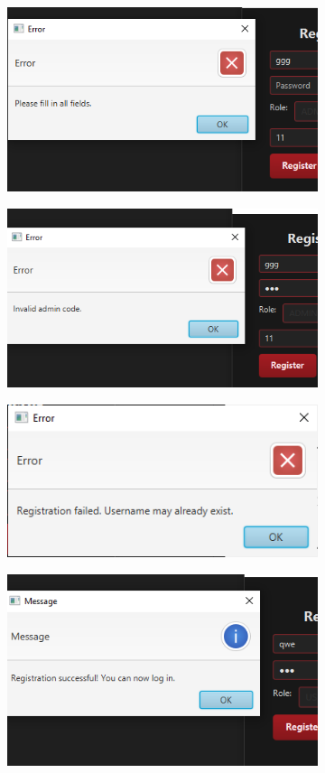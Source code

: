 \begin{figure}[H]
    \begin{subfigure}{0.5\textwidth}
        \centering
        \includegraphics[width=.7\linewidth]{figures/ErrorFields.png}
        \subcaption{\label{subfigure_a}}
    \end{subfigure}
    \begin{subfigure}{0.5\textwidth}
        \centering
        \includegraphics[width=.7\linewidth]{figures/ErrorCode.png}
        \subcaption{\label{subfigure_b}}
    \end{subfigure}
    \begin{subfigure}{0.5\textwidth}
        \centering
        \includegraphics[width=.7\linewidth]{figures/ErrorExist.png}
        \subcaption{\label{subfigure_c}}
    \end{subfigure}
    \begin{subfigure}{0.5\textwidth}
        \centering
        \includegraphics[width=.7\linewidth]{figures/SuccesRegister.png}

\end{subfigure}
\end{figure}
